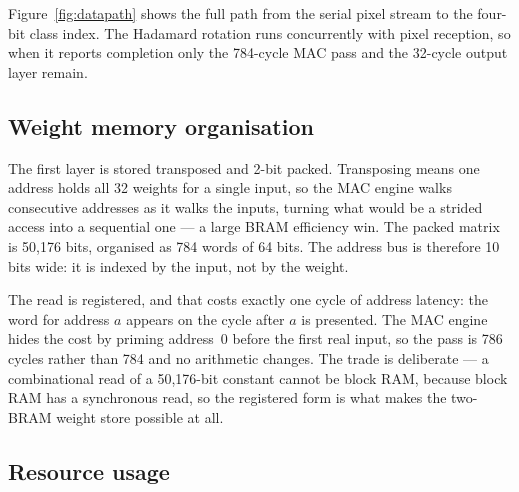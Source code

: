 \documentclass[11pt,a4paper]{article}
\begin{document}
Figure~\ref{fig:datapath} shows the full path from the serial pixel stream to
the four-bit class index. The Hadamard rotation runs concurrently with pixel
reception, so when it reports completion only the 784-cycle MAC pass and the
32-cycle output layer remain.

\subsection{Weight memory organisation}

The first layer is stored transposed and 2-bit packed. Transposing means one
address holds all 32 weights for a single input, so the MAC engine walks
consecutive addresses as it walks the inputs, turning what would be a strided
access into a sequential one --- a large BRAM efficiency win. The packed matrix
is 50{,}176 bits, organised as 784 words of 64 bits. The address bus is
therefore 10 bits wide: it is indexed by the input, not by the weight.

The read is registered, and that costs exactly one cycle of address latency:
the word for address $a$ appears on the cycle after $a$ is presented. The MAC
engine hides the cost by priming address~0 before the first real input, so the
pass is 786 cycles rather than 784 and no arithmetic changes. The trade is
deliberate --- a combinational read of a 50{,}176-bit constant cannot be block
RAM, because block RAM has a synchronous read, so the registered form is what
makes the two-BRAM weight store possible at all.

\subsection{Resource usage}
\end{document}
